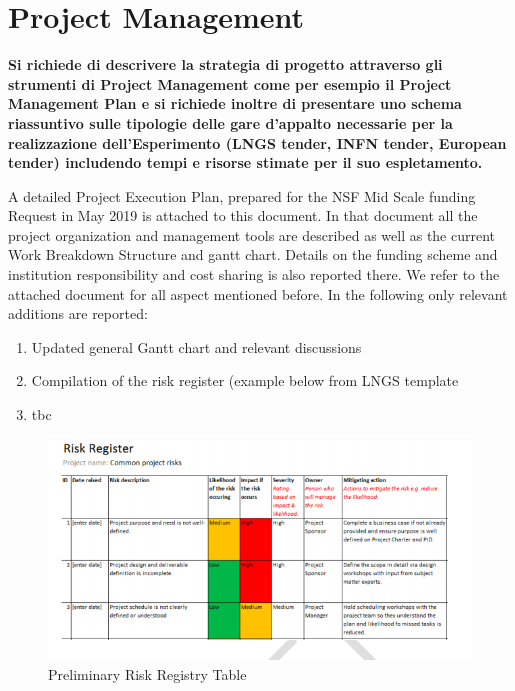 \section{Project Management}
\label{sec:ProjectManagement}

{\bf\color{red}
Si richiede di descrivere la strategia di progetto attraverso gli strumenti di Project Management come per esempio il Project Management Plan e si richiede inoltre di presentare uno schema riassuntivo sulle tipologie delle gare d’appalto necessarie per la realizzazione dell’Esperimento (LNGS tender, INFN tender, European tender) includendo tempi e risorse stimate per il suo espletamento.
}

A detailed Project Execution Plan, prepared for the NSF Mid Scale funding Request in May 2019 is attached to this document. In that document all the project organization and management tools are described as well as the current Work Breakdown Structure and gantt chart. Details on the funding scheme and institution responsibility and cost sharing is also reported there. We refer to the attached document for all aspect mentioned before. In the following only relevant additions  are reported:


\begin{enumerate}
\item Updated general Gantt chart and relevant discussions
\item Compilation of the risk register (example below from LNGS template
\item tbc
\end{enumerate}




\begin{figure}
\begin{center}
\includegraphics[width=\textwidth]{./Figures/RiskRegisterLNGSTemplate}
\caption{Preliminary Risk Registry Table}
\label{fig:RiskRegistry}
\end{center}
\end{figure}
